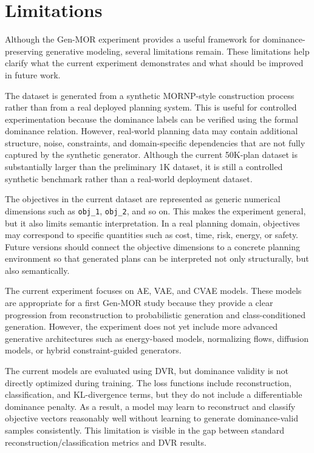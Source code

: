 \section{Limitations}
\label{sec:limitations}

Although the Gen-MOR experiment provides a useful framework for dominance-preserving generative modeling, several limitations remain. These limitations help clarify what the current experiment demonstrates and what should be improved in future work.

The dataset is generated from a synthetic MORNP-style construction process rather than from a real deployed planning system. This is useful for controlled experimentation because the dominance labels can be verified using the formal dominance relation. However, real-world planning data may contain additional structure, noise, constraints, and domain-specific dependencies that are not fully captured by the synthetic generator. Although the current 50K-plan dataset is substantially larger than the preliminary 1K dataset, it is still a controlled synthetic benchmark rather than a real-world deployment dataset.

The objectives in the current dataset are represented as generic numerical dimensions such as \texttt{obj\_1}, \texttt{obj\_2}, and so on. This makes the experiment general, but it also limits semantic interpretation. In a real planning domain, objectives may correspond to specific quantities such as cost, time, risk, energy, or safety. Future versions should connect the objective dimensions to a concrete planning environment so that generated plans can be interpreted not only structurally, but also semantically.

The current experiment focuses on AE, VAE, and CVAE models. These models are appropriate for a first Gen-MOR study because they provide a clear progression from reconstruction to probabilistic generation and class-conditioned generation. However, the experiment does not yet include more advanced generative architectures such as energy-based models, normalizing flows, diffusion models, or hybrid constraint-guided generators.

The current models are evaluated using DVR, but dominance validity is not directly optimized during training. The loss functions include reconstruction, classification, and KL-divergence terms, but they do not include a differentiable dominance penalty. As a result, a model may learn to reconstruct and classify objective vectors reasonably well without learning to generate dominance-valid samples consistently. This limitation is visible in the gap between standard reconstruction/classification metrics and DVR results.

